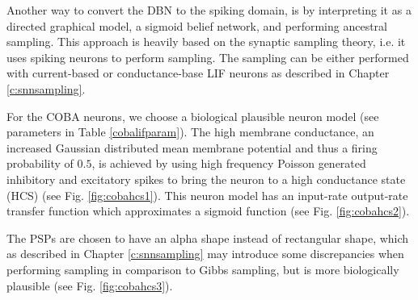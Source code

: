 Another way to convert the DBN to the spiking domain, is by interpreting it as a directed graphical model, a sigmoid belief network, and performing ancestral sampling.
This approach is heavily based on the synaptic sampling theory, i.e. it uses spiking neurons to perform sampling.
The sampling can be either performed with current-based or conductance-base LIF neurons as described in Chapter \ref{c:snnsampling}.

For the COBA neurons, we choose a biological plausible neuron model (see parameters in Table \ref{cobalifparam}). 
The high membrane conductance, an increased Gaussian distributed mean membrane potential and thus a firing probability of $0.5$, is achieved by using high frequency Poisson generated inhibitory and excitatory spikes to bring the neuron to a high conductance state (HCS) (see Fig. \ref{fig:cobahcs1}). 
This neuron model has an input-rate output-rate transfer function which approximates a sigmoid function (see Fig. \ref{fig:cobahcs2}).

The PSPs are chosen to have an alpha shape instead of rectangular shape, which as described in Chapter \ref{c:snnsampling} may introduce some discrepancies when performing sampling in comparison to Gibbs sampling, but is more biologically plausible (see Fig. \ref{fig:cobahcs3}).

